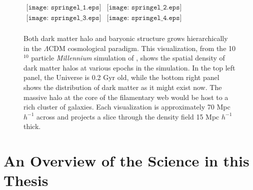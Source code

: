 \begin{figure*}
\begin{center}$
\begin{array}{cc}
\texttt{[image: springel\_1.eps]}  &
\texttt{[image: springel\_2.eps]}  \\
\texttt{[image: springel\_3.eps]}  &
\texttt{[image: springel\_4.eps]}  \\
\end{array}$
\end{center}
\caption[The hierarchical growth of cold dark matter halos throughout cosmic time]{Both dark matter halo and baryonic structure grows hierarchically in the $\Lambda$CDM cosmological paradigm. This visualization, from the 10$^{10}$ particle {\it Millennium} 
simulation of \citet{springel05}, shows the spatial density 
of dark matter halos at various epochs in the simulation. In the top left panel, the Universe is 0.2 Gyr old, while the bottom right panel shows the distribution of dark matter as it might exist now. 
The massive halo at the core of the filamentary web would be host to a rich cluster of galaxies. 
Each visualization is approximately 70 Mpc $h^{-1}$ across and projects a slice through the density field 15 Mpc  $h^{-1}$ thick.}
\label{fig:intro_springel}
\end{figure*}



\section{An Overview of the Science in this Thesis}



